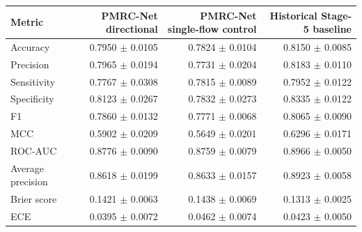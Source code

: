 \begin{tabular}{lrrr}
\toprule
Metric & PMRC-Net directional & PMRC-Net single-flow control & Historical Stage-5 baseline \\
\midrule
Accuracy & 0.7950 $\pm$ 0.0105 & 0.7824 $\pm$ 0.0104 & 0.8150 $\pm$ 0.0085 \\
Precision & 0.7965 $\pm$ 0.0194 & 0.7731 $\pm$ 0.0204 & 0.8183 $\pm$ 0.0110 \\
Sensitivity & 0.7767 $\pm$ 0.0308 & 0.7815 $\pm$ 0.0089 & 0.7952 $\pm$ 0.0122 \\
Specificity & 0.8123 $\pm$ 0.0267 & 0.7832 $\pm$ 0.0273 & 0.8335 $\pm$ 0.0122 \\
F1 & 0.7860 $\pm$ 0.0132 & 0.7771 $\pm$ 0.0068 & 0.8065 $\pm$ 0.0090 \\
MCC & 0.5902 $\pm$ 0.0209 & 0.5649 $\pm$ 0.0201 & 0.6296 $\pm$ 0.0171 \\
ROC-AUC & 0.8776 $\pm$ 0.0090 & 0.8759 $\pm$ 0.0079 & 0.8966 $\pm$ 0.0050 \\
Average precision & 0.8618 $\pm$ 0.0199 & 0.8633 $\pm$ 0.0157 & 0.8923 $\pm$ 0.0058 \\
Brier score & 0.1421 $\pm$ 0.0063 & 0.1438 $\pm$ 0.0069 & 0.1313 $\pm$ 0.0025 \\
ECE & 0.0395 $\pm$ 0.0072 & 0.0462 $\pm$ 0.0074 & 0.0423 $\pm$ 0.0050 \\
\bottomrule
\end{tabular}
